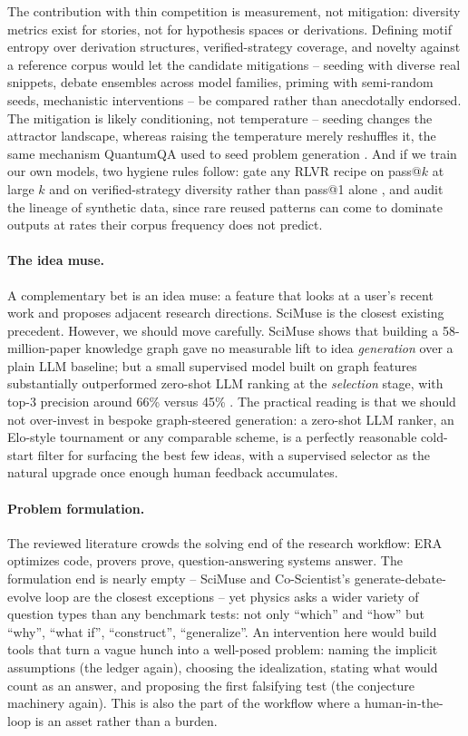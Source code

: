 The contribution with thin competition is measurement, not mitigation: diversity metrics exist for stories, not for hypothesis spaces or derivations. Defining motif entropy over derivation structures, verified-strategy coverage, and novelty against a reference corpus would let the candidate mitigations -- seeding with diverse real snippets, debate ensembles across model families, priming with semi-random seeds, mechanistic interventions -- be compared rather than anecdotally endorsed. The mitigation is likely conditioning, not temperature -- seeding changes the attractor landscape, whereas raising the temperature merely reshuffles it, the same mechanism QuantumQA used to seed problem generation \cite{2604.18176}. And if we train our own models, two hygiene rules follow: gate any RLVR recipe on pass@$k$ at large $k$ and on verified-strategy diversity rather than pass@1 alone \cite{2605.27878}, and audit the lineage of synthetic data, since rare reused patterns can come to dominate outputs at rates their corpus frequency does not predict.

\paragraph{The idea muse.}
A complementary bet is an idea muse: a feature that looks at a user's recent work and proposes adjacent research directions. SciMuse is the closest existing precedent. However, we should move carefully. SciMuse shows that building a 58-million-paper knowledge graph gave no measurable lift to idea \emph{generation} over a plain LLM baseline; but a small supervised model built on graph features substantially outperformed zero-shot LLM ranking at the \emph{selection} stage, with top-3 precision around 66\% versus 45\% \cite{2405.17044}. The practical reading is that we should not over-invest in bespoke graph-steered generation: a zero-shot LLM ranker, an Elo-style tournament or any comparable scheme, is a perfectly reasonable cold-start filter for surfacing the best few ideas, with a supervised selector as the natural upgrade once enough human feedback accumulates.

\paragraph{Problem formulation.}
The reviewed literature crowds the solving end of the research workflow: ERA optimizes code, provers prove, question-answering systems answer. The formulation end is nearly empty -- SciMuse and Co-Scientist's generate-debate-evolve loop are the closest exceptions \cite{2405.17044, Gottweis2026} -- yet physics asks a wider variety of question types than any benchmark tests: not only ``which'' and ``how'' but ``why'', ``what if'', ``construct'', ``generalize''. An intervention here would build tools that turn a vague hunch into a well-posed problem: naming the implicit assumptions (the ledger again), choosing the idealization, stating what would count as an answer, and proposing the first falsifying test (the conjecture machinery again). This is also the part of the workflow where a human-in-the-loop is an asset rather than a burden.

